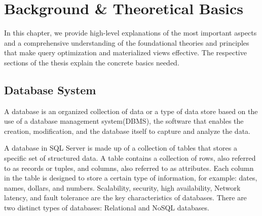 \section{Background \& Theoretical Basics }

In this chapter, we provide high-level explanations of the most important aspects and a comprehensive understanding of the foundational theories and principles that make query optimization and materialized views effective. The respective sections of the thesis explain the concrete basics needed.

\subsection{ Database System}

\begin{definition}
A database is an organized collection of data or a type of data store based on the use of a database management system(DBMS), the software that enables the creation, modification, and the database itself to capture and analyze the data.\end{definition}\vspace{.4cm}
A database in SQL Server is made up of a collection of tables that stores a specific set of structured data. A table contains a collection of rows, also referred to as records or tuples, and columns, also referred to as attributes. Each column in the table is designed to store a certain type of information, for example: dates, names, dollars, and numbers.\cite{williamdassafmsft-2024} Scalability, security, high availability, Network latency, and fault tolerance are the key characteristics of databases. There are two distinct types of databases: Relational and NoSQL databases.

